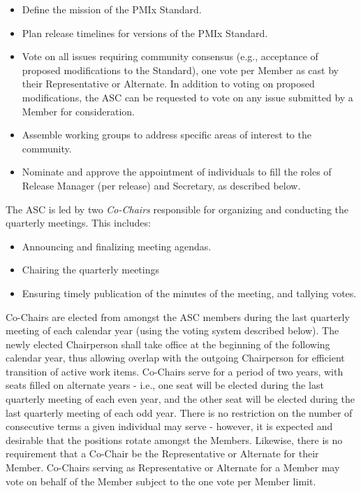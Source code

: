 \documentclass{article}
\providecommand{\tightlist}{%
  \setlength{\itemsep}{0pt}\setlength{\parskip}{0pt}}
\begin{document}
\begin{itemize}
\tightlist
\item
  Define the mission of the PMIx Standard.
\item
  Plan release timelines for versions of the PMIx Standard.
\item
  Vote on all issues requiring community consensus (e.g., acceptance of
  proposed modifications to the Standard), one vote per Member as cast
  by their Representative or Alternate. In addition to voting on
  proposed modifications, the ASC can be requested to vote on any issue
  submitted by a Member for consideration.
\item
  Assemble working groups to address specific areas of interest to the
  community.
\item
  Nominate and approve the appointment of individuals to fill the roles
  of Release Manager (per release) and Secretary, as described below.
\end{itemize}

The ASC is led by two \textit{Co-Chairs} responsible for organizing and
conducting the quarterly meetings. This includes:

\begin{itemize}
\tightlist
\item
  Announcing and finalizing meeting agendas.
\item
  Chairing the quarterly meetings
\item
  Ensuring timely publication of the minutes of the meeting, and
  tallying votes.
\end{itemize}

Co-Chairs are elected from amongst the ASC members during the last
quarterly meeting of each calendar year (using the voting system
described below). The newly elected Chairperson shall take office at the
beginning of the following calendar year, thus allowing overlap with the
outgoing Chairperson for efficient transition of active work items.
Co-Chairs serve for a period of two years, with seats filled on
alternate years - i.e., one seat will be elected during the last
quarterly meeting of each even year, and the other seat will be elected
during the last quarterly meeting of each odd year. There is no
restriction on the number of consecutive terms a given individual may
serve - however, it is expected and desirable that the positions rotate
amongst the Members. Likewise, there is no requirement that a Co-Chair
be the Representative or Alternate for their Member. Co-Chairs serving
as Representative or Alternate for a Member may vote on behalf of the
Member subject to the one vote per Member limit.
\end{document}
